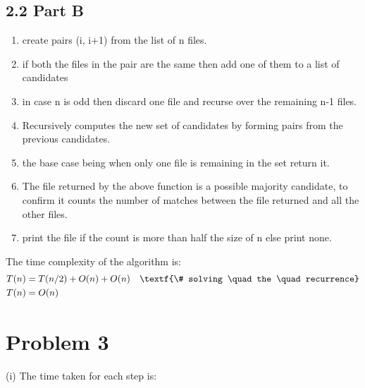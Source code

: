 \documentclass[12pt]{article}
\begin{document}
\subsection*{2.2 Part B} 

\vspace{10pt}
\begin{enumerate}
\item create pairs (i, i+1) from the list of n files. 
\item if both the files in the pair are the same then add one of them to a list of candidates
\item in case n is odd then discard one file and recurse over the remaining n-1 files.
\item Recursively computes the new set of candidates by forming pairs from the previous candidates. 
\item the base case being when only one file is remaining in the set return it. 
\item The file returned by the above function is a possible majority candidate, to confirm it counts the number of matches between the file returned and all the other files. 
\item print the file if the count is more than half the size of n else print none.
\end{enumerate}

The time complexity of the algorithm is: 
\begin{equation}
\begin{aligned}
\nonumber
T(n)&=T(n/2)+O(n)+O(n) \quad \textf{\# solving \quad the \quad recurrence} \\
T(n)&=O(n)
\end{aligned}
\end{equation}

\section*{Problem 3}


(i) The time taken for each step is:
\end{document}
